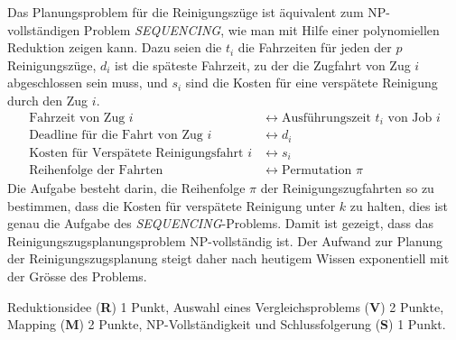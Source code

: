\begin{loesung}
Das Planungsproblem für die Reinigungszüge ist äquivalent zum
NP-vollständigen Problem \textsl{SEQUENCING}, wie man mit Hilfe
einer polynomiellen Reduktion zeigen kann.
Dazu seien die $t_i$ die Fahrzeiten für jeden der $p$ Reinigungszüge,
$d_i$ ist die späteste Fahrzeit, zu der die Zugfahrt von Zug
$i$ abgeschlossen sein muss, und $s_i$ sind die Kosten für eine verspätete
Reinigung durch den Zug $i$.
\begin{align*}
\text{Fahrzeit von Zug $i$}
&
\leftrightarrow\text{Ausführungszeit $t_i$ von Job $i$}
\\
\text{Deadline für die Fahrt von Zug $i$}
&
\leftrightarrow d_i
\\
\text{Kosten für Verspätete Reinigungsfahrt $i$}
&
\leftrightarrow s_i
\\
\text{Reihenfolge der Fahrten}&
\leftrightarrow \text{Permutation $\pi$}
\end{align*}
Die Aufgabe besteht darin, die Reihenfolge $\pi$ der Reinigungszugfahrten so
zu bestimmen, dass die Kosten für verspätete Reinigung unter $k$ zu halten,
dies ist genau die Aufgabe des \textsl{SEQUENCING}-Problems.
Damit ist gezeigt, dass das Reinigungszugsplanungsproblem NP-vollständig ist.
Der Aufwand zur Planung der Reinigungszugsplanung steigt daher nach heutigem
Wissen exponentiell mit der Grösse des Problems.
\end{loesung}

\begin{bewertung}
Reduktionsidee ({\bf R}) 1 Punkt,
Auswahl eines Vergleichsproblems ({\bf V}) 2 Punkte,
Mapping ({\bf M}) 2 Punkte,
NP-Vollständigkeit und Schlussfolgerung ({\bf S}) 1 Punkt.
\end{bewertung}
